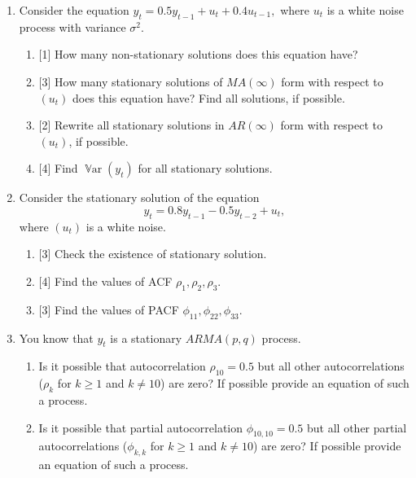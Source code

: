 \documentclass[12pt]{article}
\DeclareMathOperator{\Var}{\mathbb{V}ar}
\begin{document}
\begin{enumerate}
\item Consider the equation
\(
y_t = 0.5 y_{t-1} + u_t + 0.4 u_{t-1},
\)
where \( u_t \) is a white noise process with variance $\sigma^2$.
\begin{enumerate}
    \item {[1]} How many non-stationary solutions does this equation have?
    \item {[3]} How many stationary solutions of $MA(\infty)$ form with respect to $(u_t)$ does this equation have? Find all solutions, if possible.
    \item {[2]} Rewrite all stationary solutions in $AR(\infty)$ form with respect to $(u_t)$, if possible.
    \item {[4]} Find $\Var(y_t)$ for all stationary solutions.
\end{enumerate}

\item Consider the stationary solution of the equation
\[
y_t = 0.8 y_{t-1} - 0.5 y_{t-2} + u_t, 
\]
where $(u_t)$ is a white noise.
\begin{enumerate}
    \item {[3]} Check the existence of stationary solution.
    \item {[4]} Find the values of ACF \( \rho_1, \rho_2, \rho_3 \).
    \item {[3]} Find the values of PACF \( \phi_{11}, \phi_{22}, \phi_{33}\).
\end{enumerate}

\item You know that $y_t$ is a stationary $ARMA(p, q)$ process. 
\begin{enumerate}
    \item Is it possible that autocorrelation $\rho_{10} = 0.5$ but all other autocorrelations ($\rho_k$ for $k \geq 1$ and $k\neq 10$) are zero?
    If possible provide an equation of such a process. 

    \item Is it possible that partial autocorrelation $\phi_{10, 10} = 0.5$ but all other partial autocorrelations ($\phi_{k,k}$ for $k \geq 1$ and $k\neq 10$) are zero?
    If possible provide an equation of such a process. 
\end{enumerate}

\end{enumerate}
\end{document}
